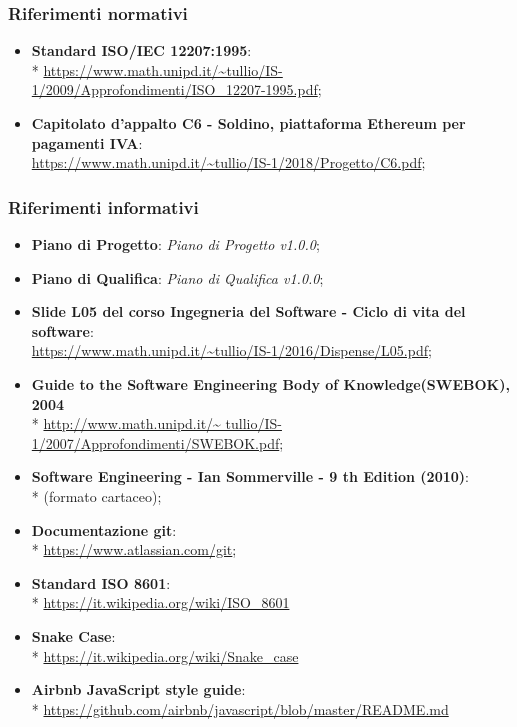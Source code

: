 \subsubsection{Riferimenti normativi}
\begin{itemize}
	\item \textbf{ Standard ISO/IEC 12207:1995}:\\* 
		\url{https://www.math.unipd.it/~tullio/IS-1/2009/Approfondimenti/ISO_12207-1995.pdf};
	\item \textbf{Capitolato d'appalto C6 - Soldino, piattaforma Ethereum per pagamenti IVA}: \\
		\url{https://www.math.unipd.it/~tullio/IS-1/2018/Progetto/C6.pdf};
\end{itemize}

\subsubsection{Riferimenti informativi}
\begin{itemize}
	\item \textbf{Piano di Progetto}: \textit{Piano di Progetto v1.0.0};
	\item \textbf{Piano di Qualifica}: \textit{Piano di Qualifica v1.0.0};
	\item \textbf{Slide L05 del corso Ingegneria del Software - Ciclo di vita 
	del software}:\\
		\url{https://www.math.unipd.it/~tullio/IS-1/2016/Dispense/L05.pdf};
	\item \textbf{Guide to the Software Engineering Body of Knowledge(SWEBOK), 2004} \\*
		\url{http://www.math.unipd.it/~	tullio/IS-1/2007/Approfondimenti/SWEBOK.pdf};
	\item \textbf{Software Engineering - Ian Sommerville - 9 th Edition (2010)}: \\*
		(formato cartaceo);
	\item \textbf{Documentazione git}: \\*
		\url{https://www.atlassian.com/git};
	\item \textbf{Standard ISO 8601}: \\*
		\url{https://it.wikipedia.org/wiki/ISO_8601}
	\item \textbf{Snake Case}\glo: \\*
		\url{https://it.wikipedia.org/wiki/Snake_case}
	\item \textbf{Airbnb JavaScript style guide}: \\*
		\url{https://github.com/airbnb/javascript/blob/master/README.md}
		
	
\end{itemize}
